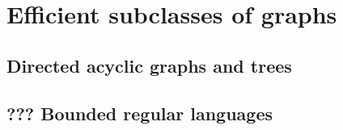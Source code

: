 \section{Efficient subclasses of graphs}
\subsection{Directed acyclic graphs and trees}
\subsection{??? Bounded regular languages}
